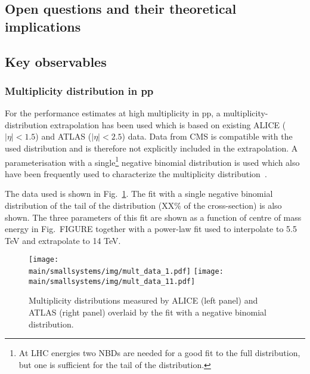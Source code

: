 \documentclass[../report.tex]{subfiles}
\providecommand{\main}{..}
\begin{document}
\subsection{Open questions and their theoretical implications}


\subsection{Key observables}

\subsubsection{Multiplicity distribution in pp}

For the performance estimates at high multiplicity in pp, a multiplicity-distribution extrapolation has been used which is based on existing ALICE ($|\eta| < 1.5$) and ATLAS ($|\eta|< 2.5$) data. Data from CMS is compatible with the used distribution and is therefore not explicitly included in the extrapolation. A parameterisation with a single\footnote{At LHC energies two NBDs are needed for a good fit to the full distribution, but one is sufficient for the tail of the distribution.} negative binomial distribution is used which also have been frequently used to characterize the multiplicity distribution~\cite{GrosseOetringhaus:2009kz,ALICE:2017pcy}.

The data used is shown in Fig.~\ref{fig:smallsystems_mult_data}. The fit with a single negative binomial distribution of the tail of the distribution (XX\% of the cross-section) is also shown. The three parameters of this fit are shown as a function of centre of mass energy in Fig.~FIGURE together with a power-law fit used to interpolate to 5.5 TeV and extrapolate to 14 TeV.

\begin{figure}[ht]
\centering
\texttt{[image: \\main/smallsystems/img/mult\_data\_1.pdf]}
\hfill
\texttt{[image: \\main/smallsystems/img/mult\_data\_11.pdf]}
\caption{Multiplicity distributions measured by ALICE (left panel) and ATLAS (right panel) overlaid by the fit with a negative binomial distribution.}
\label{fig:smallsystems_mult_data}
\end{figure}
\end{document}
